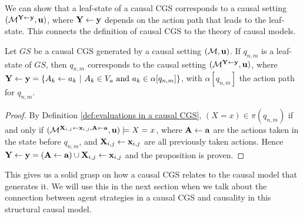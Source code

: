 We can show that a leaf-state of a causal CGS corresponds to a causal setting $(\mathcal{M}^{\mathbf{Y} \leftarrow \mathbf{y}},\mathbf{u})$, where $\mathbf{Y} \leftarrow \mathbf{y}$ depends on the action path that leads to the leaf-state. 
This connects the definition of causal CGS to the theory of causal models.
\begin{proposition}\label{prop:state correspondence}
    Let $GS$ be a causal CGS generated by a causal setting $(\mathcal{M},\mathbf{u})$. If $q_{n,m}$ is a leaf-state of $GS$, then $q_{n,m}$ corresponds to the causal setting $(\mathcal{M}^{\mathbf{Y}\leftarrow \mathbf{y}}, \mathbf{u})$, where $\mathbf{Y} \leftarrow \mathbf{y} = \{A_k \leftarrow a_k \ | \ A_k \in V_a \text{ and } a_k \in \alpha[q_{n,m}]\}$, with $\alpha[q_{n,m}]$ the action path for $q_{n,m}$.
\end{proposition}
\begin{proof}
    By Definition \ref{def:evaluations in a causal CGS}, $(X = x) \in \pi(q_{n,m})$ if and only if $(\mathcal{M}^{\mathbf{X}_{i,j}\leftarrow \mathbf{x}_{i,j}, \mathbf{A} \leftarrow \mathbf{a}},\mathbf{u})\models X = x$, 
    where $\mathbf{A} \leftarrow \mathbf{a}$ are the actions taken in the state before $q_{n,m}$, and $\mathbf{X}_{i,j}\leftarrow \mathbf{x}_{i,j}$ are all previously taken actions. Hence $\mathbf{Y} \leftarrow \mathbf{y} = (\mathbf{A} \leftarrow \mathbf{a}) \cup \mathbf{X}_{i,j}\leftarrow \mathbf{x}_{i,j}$ and the proposition is proven.
\end{proof}

This gives us a solid grasp on how a causal CGS relates to the causal model that generates it.
We will use this in the next section when we talk about the connection between agent strategies in a causal CGS and causality in this structural causal model.
